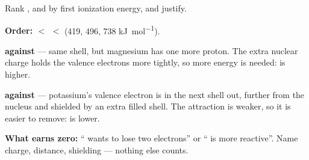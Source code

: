 \documentclass{apchem-worksheet}
\begin{document}
\begin{workedexample}
Rank ,  and  by first ionization energy, and justify.

\textbf{Order:  $<$  $<$ } (419, 496, 738
\si{\kilo\joule\per\mole}).

\textbf{ against } --- same shell, but magnesium has one
more proton. The extra nuclear charge holds the valence electrons more
tightly, so more energy is needed:  is higher.

\textbf{ against } --- potassium's valence electron is in the
next shell out, further from the nucleus and shielded by an extra filled
shell. The attraction is weaker, so it is easier to remove:  is
lower.

\textbf{What earns zero:} `` wants to lose two electrons'' or
`` is more reactive''. Name charge, distance, shielding --- nothing
else counts.
\end{workedexample}
\end{document}
